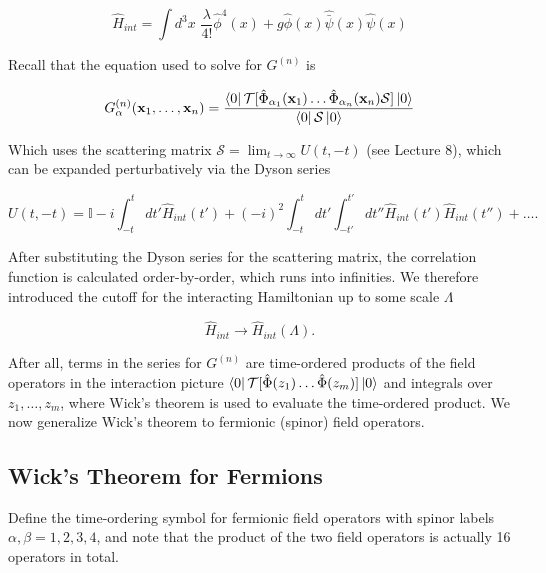 \begin{equation}
\hat{H}_{int} = \int d^3 x \,\, \frac{\lambda}{4!} \hat{\phi}^4 (x) + g \hat{\phi} (x) \hat{\bar{\psi}} (x) \hat{\psi} (x)
\end{equation}

\noindent Recall that the equation used to solve for $G^{(n)}$ is

\begin{equation}
G^{(n)}_\alpha (\textbf{x}_1, \dots, \textbf{x}_n) = \frac{\bra{0} \mathcal{T} [\hat{\Phi}_{\alpha_1} (\textbf{x}_1) \dots \hat{\Phi}_{\alpha_n} (\textbf{x}_n) \mathcal{S} ] \ket{0}}{\bra{0} \mathcal{S} \ket{0}}
\end{equation}

\noindent Which uses the scattering matrix $\mathcal{S} = \lim_{t \rightarrow \infty} U(t, -t)$ (see Lecture 8), which can be expanded perturbatively via the Dyson series

\begin{equation}
U(t, -t) = \mathbb{I} - i \int^t_{-t} dt' \hat{H}_{int} (t') + (-i)^2 \int^t_{-t} dt' \int^{t'}_{-t'} dt'' \hat{H}_{int} (t') \hat{H}_{int} (t'') + \dots .
\end{equation}

\noindent After substituting the Dyson series for the scattering matrix, the correlation function is calculated order-by-order, which runs into infinities. We therefore introduced the cutoff for the interacting Hamiltonian up to some scale $\Lambda$

\begin{equation}
\hat{H}_{int} \rightarrow \hat{H}_{int} (\Lambda). 
\end{equation}

\noindent After all, terms in the series for $G^{(n)}$ are time-ordered products of the field operators in the interaction picture $\bra{0}  \mathcal{T} [\hat{\Phi} (z_1) \dots \hat{\Phi} (z_m) ] \ket{0}$ and integrals over $z_1, \dots, z_m$, where Wick's theorem is used to evaluate the time-ordered product. We now generalize Wick's theorem to fermionic (spinor) field operators.

\subsection*{Wick's Theorem for Fermions}

\noindent Define the time-ordering symbol for fermionic field operators with spinor labels $\alpha, \beta = 1, 2, 3, 4$, and note that the product of the two field operators is actually 16 operators in total.

